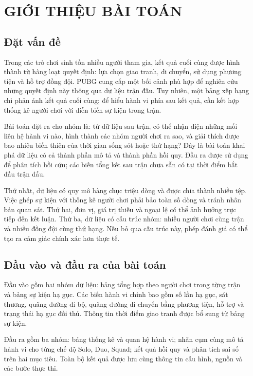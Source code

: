 \documentclass[12pt,a4paper]{article}
\begin{document}
\section{GIỚI THIỆU BÀI TOÁN}
\subsection{Đặt vấn đề}
Trong các trò chơi sinh tồn nhiều người tham gia, kết quả cuối cùng được hình thành từ hàng loạt quyết định: lựa chọn giao tranh, di chuyển, sử dụng phương tiện và hỗ trợ đồng đội. PUBG cung cấp một bối cảnh phù hợp để nghiên cứu những quyết định này thông qua dữ liệu trận đấu. Tuy nhiên, một bảng xếp hạng chỉ phản ánh kết quả cuối cùng; để hiểu hành vi phía sau kết quả, cần kết hợp thống kê người chơi với diễn biến sự kiện trong trận.

Bài toán đặt ra cho nhóm là: từ dữ liệu sau trận, có thể nhận diện những mối liên hệ hành vi nào, hình thành các nhóm người chơi ra sao, và giải thích được bao nhiêu biến thiên của thời gian sống sót hoặc thứ hạng? Đây là bài toán khai phá dữ liệu có cả thành phần mô tả và thành phần hồi quy. Đầu ra được sử dụng để phân tích hồi cứu; các biến tổng kết sau trận chưa sẵn có tại thời điểm bắt đầu trận đấu.

Thứ nhất, dữ liệu có quy mô hàng chục triệu dòng và được chia thành nhiều tệp. Việc ghép sự kiện với thống kê người chơi phải bảo toàn số dòng và tránh nhân bản quan sát. Thứ hai, đơn vị, giá trị thiếu và ngoại lệ có thể ảnh hưởng trực tiếp đến kết luận. Thứ ba, dữ liệu có cấu trúc nhóm: nhiều người chơi cùng trận và nhiều đồng đội cùng thứ hạng. Nếu bỏ qua cấu trúc này, phép đánh giá có thể tạo ra cảm giác chính xác hơn thực tế.
\subsection{Đầu vào và đầu ra của bài toán}
Đầu vào gồm hai nhóm dữ liệu: bảng tổng hợp theo người chơi trong từng trận và bảng sự kiện hạ gục. Các biến hành vi chính bao gồm số lần hạ gục, sát thương, quãng đường đi bộ, quãng đường di chuyển bằng phương tiện, hỗ trợ và trạng thái hạ gục đối thủ. Thông tin thời điểm giao tranh được bổ sung từ bảng sự kiện.

Đầu ra gồm ba nhóm: bảng thống kê và quan hệ hành vi; nhãn cụm cùng mô tả hành vi cho từng chế độ Solo, Duo, Squad; kết quả hồi quy và phân tích sai số trên hai mục tiêu. Toàn bộ kết quả được lưu cùng thông tin cấu hình, nguồn và các bước thực thi.
\end{document}

